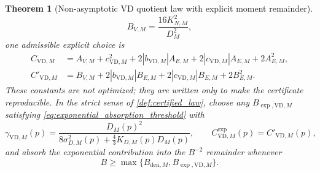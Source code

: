 \documentclass[11pt]{article}
\newtheorem{theorem}{Theorem}
\newcommand{\1}{\mathbf{1}}
\newcommand{\abs}[1]{\left\lvert #1 \right\rvert}
\begin{document}
\begin{theorem}[Non-asymptotic VD quotient law with explicit moment remainder]
\begin{equation}
    B_{V,M}=\frac{16K_{N,M}^2}{D_M^2},
\end{equation}
one admissible explicit choice is
\begin{align}
    C_{\mathrm{VD},M}
    &=A_{V,M}+c_{\mathrm{VD},M}^2
      +2\abs{b_{\mathrm{VD},M}}A_{E,M}
      +2\abs{c_{\mathrm{VD},M}}A_{E,M}
      +2A_{E,M}^2,\\
    C'_{\mathrm{VD},M}
    &=B_{V,M}+2\abs{b_{\mathrm{VD},M}}B_{E,M}
      +2\abs{c_{\mathrm{VD},M}}B_{E,M}+2B_{E,M}^2.
\end{align}
These constants are not optimized; they are written only to make the certificate reproducible.  In the strict sense of \cref{def:certified_law}, choose any \(B_{\exp,\mathrm{VD},M}\) satisfying \cref{eq:exponential_absorption_threshold} with
\begin{equation}
    \gamma_{\mathrm{VD},M}(p)=\frac{D_M(p)^2}{8\sigma_{D,M}^2(p)+\frac43 K_{D,M}(p)D_M(p)},
    \qquad
    C_{\mathrm{VD},M}^{\exp}(p)=C'_{\mathrm{VD},M}(p),
\end{equation}
and absorb the exponential contribution into the \(B^{-2}\) remainder whenever
\[
    B\geq\max\{B_{\mathrm{den},M},B_{\exp,\mathrm{VD},M}\}.
\]
\end{theorem}
\end{document}
